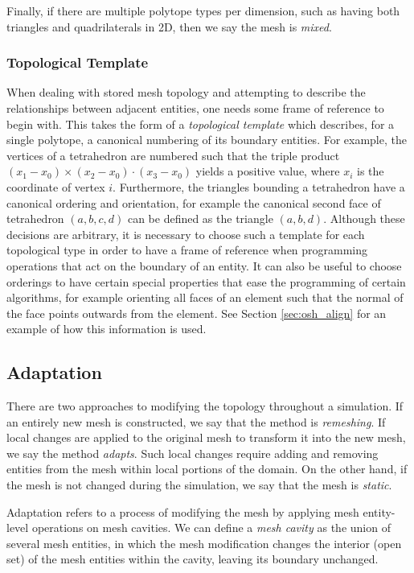 Finally, if there are multiple polytope types per dimension,
such as having both triangles and quadrilaterals in 2D, then
we say the mesh is {\it mixed}.

\subsubsection{Topological Template}
\label{sec:topo_template}

When dealing with stored mesh topology and attempting to describe
the relationships between adjacent entities, one needs some frame
of reference to begin with.
This takes the form of a \emph{topological template}
\cite{seol2005fmdb, karamete2016novel} which describes,
for a single polytope, a canonical numbering of its boundary entities.
For example, the vertices of a tetrahedron are numbered such that
the triple product $(x_1-x_0)\times(x_2-x_0)\cdot(x_3-x_0)$ yields
a positive value, where $x_i$ is the coordinate of vertex $i$.
Furthermore, the triangles bounding a tetrahedron have a canonical
ordering and orientation, for example the canonical second face of tetrahedron
$(a,b,c,d)$ can be defined as the triangle $(a,b,d)$.
Although these decisions are arbitrary, it is necessary to choose
such a template for each topological type in order to have
a frame of reference when programming operations that act on the boundary
of an entity.
It can also be useful to choose orderings to have certain special
properties that ease the programming of certain algorithms, for
example orienting all faces of an element such that the normal of
the face points outwards from the element.
See Section \ref{sec:osh_align} for an example of how this
information is used.

\subsection{Adaptation}
\label{sec:def_adapt}

There are two approaches to modifying the topology throughout
a simulation.
If an entirely new mesh is constructed, we say that the
method is {\it remeshing}.
If local changes are applied to the original mesh to transform
it into the new mesh, we say the method {\it adapts}.
Such local changes require adding and removing entities
from the mesh within local portions of the domain.
On the other hand, if the mesh is not changed during the
simulation, we say that the mesh is {\it static}.

Adaptation refers to a process of modifying the mesh by applying
mesh entity-level operations on mesh cavities.
We can define a {\it mesh cavity} as the
union of several mesh entities, in which the
mesh modification changes the interior (open set) of
the mesh entities within the cavity, leaving its boundary unchanged.

